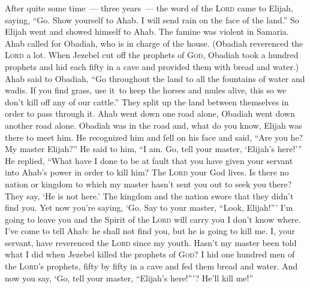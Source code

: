 
\begin{inparaenum}
     After quite some time~--- three years~--- the word of the \textsc{Lord} came to Elijah, saying, ``Go. Show yourself to Ahab. I will send rain on the face of the land.''%
     So Elijah went and showed himself to Ahab. The famine was violent in Samaria.%
     Ahab called for Obadiah, who is in charge of the house. (Obadiah reverenced the \textsc{Lord} a lot.%
     When Jezebel cut off the prophets of \textsc{God}, Obadiah took a hundred prophets and hid each fifty in a cave and provided them with bread and water.)%
     Ahab said to Obadiah, ``Go throughout the land to all the fountains of water and wadis. If you find grass, use it\understood\ to keep the horses and mules alive, this so we don't kill off any of our cattle.''%
     They split up the land between themselves in order to pass through it. Ahab went down one road alone, Obadiah went down another road alone.%
     Obadiah was in the road and, what do you know, Elijah was there to meet him. He recognized him and fell on his face and said, ``Are you he? My master Elijah?''%
     He said to him, ``I am. Go, tell your master, `Elijah's here!'\thinspace''%
     He replied, ``What have I done to be at fault that you have given your servant into Ahab's power in order to kill him?%
     The \textsc{Lord} your God lives. Is there no nation or kingdom to which my master hasn't sent you out to seek you there? They say, `He is not here.' The kingdom and the nation swore that they didn't find you.%
     Yet now you're saying, `Go. Say to your master, ``Look, Elijah!''\thinspace'%
     I'm going to leave you and the Spirit of the \textsc{Lord} will carry you I don't know where. I've come to tell Ahab: he shall not find you, but he is going to kill me. I, your servant, have reverenced the \textsc{Lord} since my youth.%
     Hasn't my master been told what I did when Jezebel killed the prophets of \textsc{God}? I hid one hundred men of the \textsc{Lord}'s prophets, fifty by fifty in a cave and fed them bread and water.%
     And now you say, `Go, tell your master, ``Elijah's here!''\thinspace'? He'll kill me!''%
    

\end{inparaenum}
